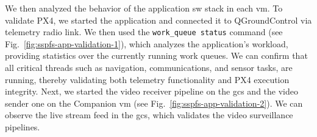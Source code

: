 We then analyzed the behavior of the application \gls{sw} stack in each
\gls{vm}.
To validate PX4, we started the application and connected it to QGroundControl
via telemetry radio link. We then used the \lstinline{work_queue status}
command (see Fig.~\ref{fig:sspfs-app-validation-1}), which analyzes the application's workload, providing statistics over
the currently running work queues. We can confirm that all critical threads such
as navigation, communications, and sensor tasks, are running, 
thereby validating both telemetry functionality and PX4 execution integrity.
%
Next, we started the video receiver pipeline on the \gls{gcs} and the video
sender one on the Companion \gls{vm} (see Fig.~\ref{fig:sspfs-app-validation-2}). We can
observe the live stream feed in the \gls{gcs}, which validates the video
surveillance pipelines.


